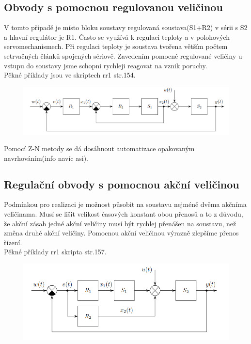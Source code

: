 \subsection*{Obvody s pomocnou regulovanou veličinou}
V tomto případě je místo bloku soustavy regulovaná soustava(S1+R2) v sérii s S2 a hlavní regulátor je R1. Často se využívá k regulaci teploty a v polohových servomechanismech. Při regulaci teploty je soustava tvořena větším počtem setrvačných článků spojených sériově. Zavedením pomocné regulované veličiny u vstupu do soustavy jsme schopni rychleji reagovat na vznik poruchy. \\
Pěkné příklady jsou ve skriptech rr1 str.154.
\begin{figure}[H]
    \includegraphics*[scale = 1]{images/pomocnaRegulace.png}
\end{figure}
Pomocí Z-N metody se dá dosáhnout automatizace opakovaným navrhováním(info navíc asi).\\

\subsection*{Regulační obvody s pomocnou akční veličinou}
Podmínkou pro realizaci je možnost působit na soustavu nejméně dvěma akčníma veličinama. Musí se lišit velikost časových konstant obou přenosů a to z důvodu, že akční zásah jedné akční veličiny musí být rychlej přenášen na soustavu, než změna druhé akční veličiny. Pomocnou akční veličinou výrazně zlepšíme přenos řízení.\\
Pěkné příklady rr1 skripta str.157.
\begin{figure}[H]
    \includegraphics*[scale = 1]{images/pomocnaAkcniVelicina.png}
\end{figure}

